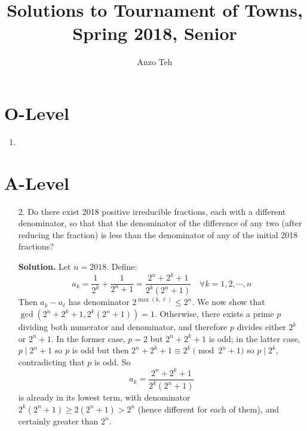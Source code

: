 \documentclass[11pt,a4paper]{article}
\begin{document}
\newcommand{\la}{\leftarrow}
\newcommand{\lra}{\leftrightarrow}
\newcommand{\bbN}{\mathbb{N}}
\newcommand{\bbZ}{\mathbb{Z}}
\newcommand{\dsum}{\displaystyle\sum}
\newcommand{\dprod}{\displaystyle\prod}


\title{Solutions to Tournament of Towns, Spring 2018, Senior}
\author{Anzo Teh}
\date{}
\maketitle

\section*{O-Level}
\begin{enumerate}
	\item
\end{enumerate}

\section*{A-Level}
\begin{enumerate}
	\item[2.] Do there exist 2018 positive irreducible fractions, each with a different denominator, so that that the denominator of the difference of any two (after reducing the fraction) is less than the denominator of any of the initial 2018 fractions?
	
	\textbf{Solution.} Let $n=2018$. Define: 
	\[
	a_k = \frac{1}{2^k} + \frac{1}{2^{n}+1} = \frac{2^n+2^k+1}{2^k(2^n+1)}\quad \forall k = 1, 2, \cdots , n
	\]
	Then $a_k-a_{\ell}$ has denominator $2^{\max(k, \ell)}\le 2^n$. We now show that $\gcd(2^n+2^k+1, 2^k(2^n+1))=1$. Otherwise, there exists a prime $p$ dividing both numerator and denominator, and therefore $p$ divides either $2^k$ or $2^n+1$. In the former case, $p=2$ but $2^n+2^k+1$ is odd; in the latter case, $p\mid 2^n+1$ so $p$ is odd but then $2^n+2^k+1\equiv 2^k\pmod{2^n+1}$ so $p\mid 2^k$, contradicting that $p$ is odd. So 
	\[
	a_k = \frac{2^n+2^k+1}{2^k(2^n+1)}
	\]
	is already in its lowest term, with denominator $2^k(2^n+1)\ge 2(2^n+1)>2^n$ (hence different for each of them), and certainly greater than $2^n$. 
\end{enumerate}
\end{document}
